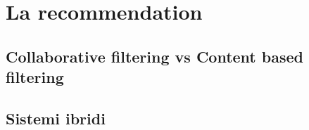 \chapter{La recommendation}

\section{Collaborative filtering vs Content based filtering}

\section{Sistemi ibridi}